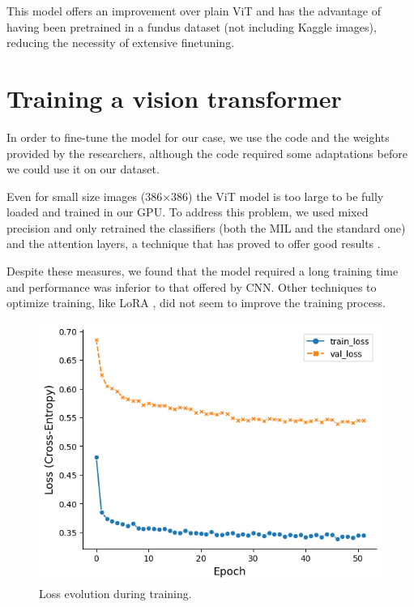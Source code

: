 This model offers an improvement over plain ViT and has the advantage of having been pretrained in a fundus dataset (not including Kaggle images), reducing the necessity of extensive finetuning. 

\section{Training a vision transformer}
In order to fine-tune the model for our case, we use the code and the weights provided by the researchers, although the code required some adaptations before we could use it on our dataset.

Even for small size images (386×386) the ViT model is too large to be fully loaded and trained in our GPU. To address this problem, we used mixed precision \cite{micikevicius2017mixed} and only retrained the classifiers (both the MIL and the standard one) and the attention layers, a technique that has proved to offer good results \cite{avidan2022things}.

Despite these measures, we found that the model required a long training time and performance was inferior to that offered by CNN. Other techniques to optimize training, like LoRA \cite{hu2021lora}, did not seem to improve the training process. 

\begin{figure}[tb]
    \centering
    \includegraphics[scale = 0.5]{figures/chapter7/loss.png}
    \caption{Loss evolution during training.}
    \label{fig:transformer_training}
\end{figure}

